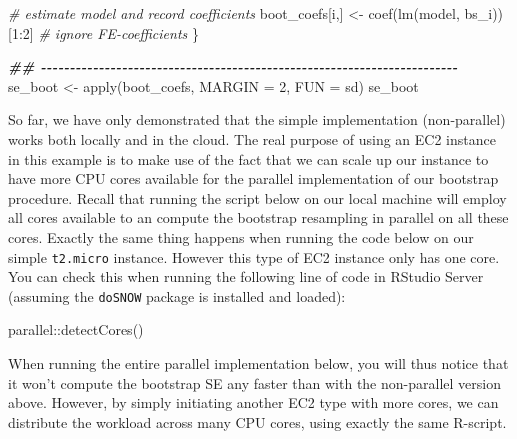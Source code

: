 \documentclass[
  12pt,
]{style/krantz}
\newenvironment{Shaded}{\begin{snugshade}}{\end{snugshade}}
\newcommand{\AttributeTok}[1]{\textcolor[rgb]{0.77,0.63,0.00}{#1}}
\newcommand{\CommentTok}[1]{\textcolor[rgb]{0.56,0.35,0.01}{\textit{#1}}}
\newcommand{\DecValTok}[1]{\textcolor[rgb]{0.00,0.00,0.81}{#1}}
\newcommand{\DocumentationTok}[1]{\textcolor[rgb]{0.56,0.35,0.01}{\textbf{\textit{#1}}}}
\newcommand{\FunctionTok}[1]{\textcolor[rgb]{0.00,0.00,0.00}{#1}}
\newcommand{\NormalTok}[1]{#1}
\newcommand{\OtherTok}[1]{\textcolor[rgb]{0.56,0.35,0.01}{#1}}
\newcommand{\SpecialCharTok}[1]{\textcolor[rgb]{0.00,0.00,0.00}{#1}}
\begin{document}
\begin{Shaded}
\begin{Highlighting}[]
  \CommentTok{\# estimate model and record coefficients}
\NormalTok{  boot\_coefs[i,] }\OtherTok{\textless{}{-}} \FunctionTok{coef}\NormalTok{(}\FunctionTok{lm}\NormalTok{(model, bs\_i))[}\DecValTok{1}\SpecialCharTok{:}\DecValTok{2}\NormalTok{] }\CommentTok{\# ignore FE{-}coefficients}
\NormalTok{\}}

\DocumentationTok{\#\# {-}{-}{-}{-}{-}{-}{-}{-}{-}{-}{-}{-}{-}{-}{-}{-}{-}{-}{-}{-}{-}{-}{-}{-}{-}{-}{-}{-}{-}{-}{-}{-}{-}{-}{-}{-}{-}{-}{-}{-}{-}{-}{-}{-}{-}{-}{-}{-}{-}{-}{-}{-}{-}{-}{-}{-}{-}{-}{-}{-}{-}{-}{-}{-}{-}{-}{-}{-}{-}{-}{-}{-}}
\NormalTok{se\_boot }\OtherTok{\textless{}{-}} \FunctionTok{apply}\NormalTok{(boot\_coefs, }
                 \AttributeTok{MARGIN =} \DecValTok{2}\NormalTok{,}
                 \AttributeTok{FUN =}\NormalTok{ sd)}
\NormalTok{se\_boot}
\end{Highlighting}
\end{Shaded}

So far, we have only demonstrated that the simple implementation (non-parallel) works both locally and in the cloud. The real purpose of using an EC2 instance in this example is to make use of the fact that we can scale up our instance to have more CPU cores available for the parallel implementation of our bootstrap procedure. Recall that running the script below on our local machine will employ all cores available to an compute the bootstrap resampling in parallel on all these cores. Exactly the same thing happens when running the code below on our simple \texttt{t2.micro} instance. However this type of EC2 instance only has one core. You can check this when running the following line of code in RStudio Server (assuming the \texttt{doSNOW} package is installed and loaded):

\begin{Shaded}
\begin{Highlighting}[]
\NormalTok{parallel}\SpecialCharTok{::}\FunctionTok{detectCores}\NormalTok{()}
\end{Highlighting}
\end{Shaded}

When running the entire parallel implementation below, you will thus notice that it won't compute the bootstrap SE any faster than with the non-parallel version above. However, by simply initiating another EC2 type with more cores, we can distribute the workload across many CPU cores, using exactly the same R-script.
\end{document}
